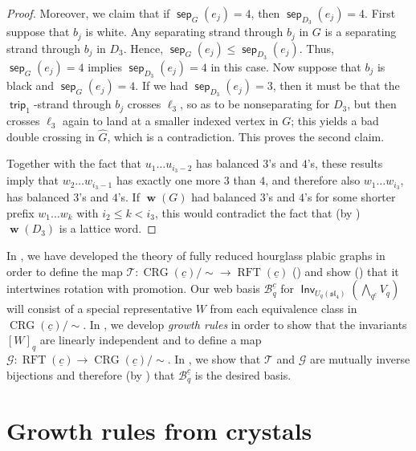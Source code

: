 \documentclass{amsart}
\theoremstyle{definition}
\theoremstyle{remark}
\numberwithin{equation}{section}
\DeclareMathOperator{\trip}{\mathsf{trip}}
\DeclareMathOperator{\bw}{\mathbf{w}}
\DeclareMathOperator{\rft}{RFT}
\newcommand{\fsl}{\mathfrak{sl}}
\DeclareMathOperator{\Inv}{\mathsf{Inv}}
\DeclareMathOperator{\sep}{\mathsf{sep}}
\DeclareMathOperator{\crg}{CRG}
\begin{document}
\begin{proof}
Moreover, we claim that if $\sep_{G}(e_j) = 4$, then $\sep_{D_3}(e_j) = 4$. First suppose that $b_j$ is white. Any separating strand through $b_j$ in $G$ is a separating strand through $b_j$ in $D_3$. Hence, $\sep_G(e_j) \leq \sep_{D_3}(e_j)$. Thus, $\sep_{G}(e_j) = 4$ implies $\sep_{D_3}(e_j) = 4$ in this case.
Now suppose that $b_j$ is black and $\sep_{G}(e_j) = 4$. If we had $\sep_{D_3}(e_j) = 3$, then it must be that the $\trip_1$-strand through $b_j$ crosses $\ell_3$, so as to be nonseparating for $D_3$, but then crosses $\ell_3$ again to land at a smaller indexed vertex in $G$; this yields a bad double crossing in $\widehat{G}$, which is a contradiction. This proves the second claim.

Together with the fact that $u_1\ldots u_{i_3-2}$ has balanced $3$'s and $4$'s, these results imply that $w_2 \ldots w_{i_3-1}$ has exactly one more $3$ than $4$, and therefore also $w_1 \ldots w_{i_3}$, has balanced $3$'s and $4$'s. If $\bw(G)$ had balanced $3$'s and $4$'s for some shorter prefix $w_1 \dots w_k$ with $i_2 \leq k < i_3$, this would contradict the fact that (by ) $\bw(D_3)$ is a lattice word.
\end{proof}

In , we have developed the theory of fully reduced hourglass plabic graphs in order to define the map $\mathcal{T}:\crg(\underline{c})/{\sim} \to \rft(\underline{c})$ () and show () that it intertwines rotation with promotion. Our web basis $\mathscr{B}_q^{\underline{c}}$ for $\Inv_{U_q(\fsl_4)}(\bigwedge_q\nolimits^{\underline{c}} V_q)$ will consist of a special representative $W$ from each equivalence class in $\crg(\underline{c})/{\sim}$. In , we develop \emph{growth rules} in order to show that the invariants $[W]_q$ are linearly independent and to define a map $\mathcal{G}:\rft(\underline{c}) \to \crg(\underline{c})/{\sim}$. In , we show that $\mathcal{T}$ and $\mathcal{G}$ are mutually inverse bijections and therefore (by ) that $\mathscr{B}_q^{\underline{c}}$ is the desired basis.

\section{Growth rules from crystals}
\label{sec:forwards-map}
\end{document}
